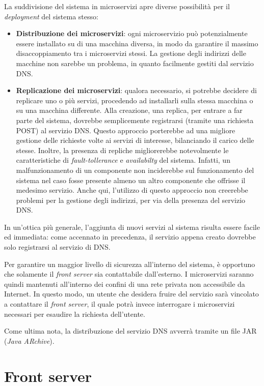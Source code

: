 \documentclass[a4paper,12pt]{report}
\begin{document}
La suddivisione del sistema in microservizi apre diverse possibilità per il \emph{deployment} del sistema stesso:
\begin{itemize}
	\item \textbf{Distribuzione dei microservizi}: ogni microservizio può potenzialmente essere installato su di una macchina diversa, in modo da garantire il massimo disaccoppiamento tra i microservizi stessi. La gestione degli indirizzi delle macchine non sarebbe un problema, in quanto facilmente gestiti dal servizio DNS.
	\item \textbf{Replicazione dei microservizi}: qualora necessario, si potrebbe decidere di replicare uno o più servizi, procedendo ad installarli sulla stessa macchina o su una macchina differente. Alla creazione, una replica, per entrare a far parte del sistema, dovrebbe semplicemente registrarsi (tramite una richiesta POST) al servizio DNS. Questo approccio porterebbe ad una migliore gestione delle richieste volte ai servizi di interesse, bilanciando il carico delle stesse. Inoltre, la presenza di repliche migliorerebbe notevolmente le caratteristiche di \emph{fault-tollerance} e \emph{availabilty} del sistema. Infatti, un malfunzionamento di un componente non inciderebbe sul funzionamento del sistema nel caso fosse presente almeno un altro componente che offrisse il medesimo servizio. Anche qui, l'utilizzo di questo approccio non creerebbe problemi per la gestione degli indirizzi, per via della presenza del servizio DNS.
\end{itemize}

In un'ottica più generale, l'aggiunta di nuovi servizi al sistema risulta essere facile ed immediata: come accennato in precedenza, il servizio appena creato dovrebbe solo registrarsi al servizio di DNS.

Per garantire un maggior livello di sicurezza all'interno del sistema, è opportuno che solamente il \emph{front server} sia contattabile dall'esterno. I microservizi saranno quindi mantenuti all'interno dei confini di una rete privata non accessibile da Internet. In questo modo, un utente che desidera fruire del servizio sarà vincolato a contattare il \emph{front server}, il quale potrà invece interrogare i microservizi necessari per esaudire la richiesta dell'utente.

Come ultima nota, la distribuzione del servizio DNS avverrà tramite un file JAR (\emph{Java ARchive}).
 
\section{Front server}
\end{document}
